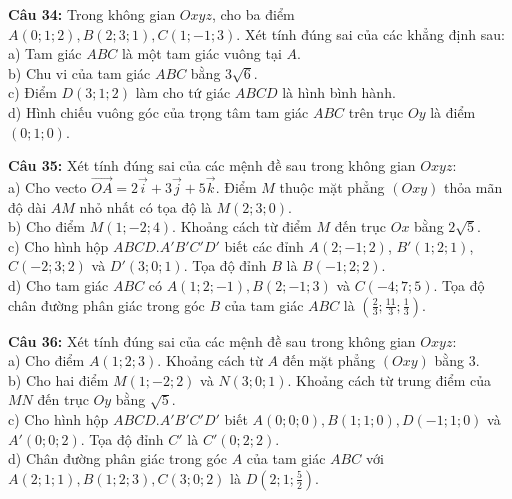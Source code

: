 \documentclass[12pt]{article}
\begin{document}
	\vspace{4mm}
	\noindent \textbf{Câu 34:} Trong không gian $Oxyz$, cho ba điểm $A(0; 1; 2), B(2; 3; 1), C(1; -1; 3)$. Xét tính đúng sai của các khẳng định sau: \\
	\noindent a) Tam giác $ABC$ là một tam giác vuông tại $A$. \\
	\noindent b) Chu vi của tam giác $ABC$ bằng $3\sqrt{6}$. \\
	\noindent c) Điểm $D(3; 1; 2)$ làm cho tứ giác $ABCD$ là hình bình hành. \\
	\noindent d) Hình chiếu vuông góc của trọng tâm tam giác $ABC$ trên trục $Oy$ là điểm $(0; 1; 0)$.
	
	\vspace{4mm}
	\noindent \textbf{Câu 35:} Xét tính đúng sai của các mệnh đề sau trong không gian $Oxyz$: \\
	\noindent a) Cho vecto $\vec{OA} = 2\vec{i} + 3\vec{j} + 5\vec{k}$. Điểm $M$ thuộc mặt phẳng $(Oxy)$ thỏa mãn độ dài $AM$ nhỏ nhất có tọa độ là $M(2; 3; 0)$. \\
	\noindent b) Cho điểm $M(1; -2; 4)$. Khoảng cách từ điểm $M$ đến trục $Ox$ bằng $2\sqrt{5}$. \\
	\noindent c) Cho hình hộp $ABCD.A'B'C'D'$ biết các đỉnh $A(2; -1; 2)$, $B'(1; 2; 1)$, $C(-2; 3; 2)$ và $D'(3; 0; 1)$. Tọa độ đỉnh $B$ là $B(-1; 2; 2)$. \\
	\noindent d) Cho tam giác $ABC$ có $A(1; 2; -1), B(2; -1; 3)$ và $C(-4; 7; 5)$. Tọa độ chân đường phân giác trong góc $B$ của tam giác $ABC$ là $\left(\frac{2}{3}; \frac{11}{3}; \frac{1}{3}\right)$.
	
	\vspace{4mm}
	\noindent \textbf{Câu 36:} Xét tính đúng sai của các mệnh đề sau trong không gian $Oxyz$: \\
	\noindent a) Cho điểm $A(1; 2; 3)$. Khoảng cách từ $A$ đến mặt phẳng $(Oxy)$ bằng $3$. \\
	\noindent b) Cho hai điểm $M(1; -2; 2)$ và $N(3; 0; 1)$. Khoảng cách từ trung điểm của $MN$ đến trục $Oy$ bằng $\sqrt{5}$. \\
	\noindent c) Cho hình hộp $ABCD.A'B'C'D'$ biết $A(0; 0; 0), B(1; 1; 0), D(-1; 1; 0)$ và $A'(0; 0; 2)$. Tọa độ đỉnh $C'$ là $C'(0; 2; 2)$. \\
	\noindent d) Chân đường phân giác trong góc $A$ của tam giác $ABC$ với $A(2; 1; 1), B(1; 2; 3), C(3; 0; 2)$ là $D\left(2; 1; \frac{5}{2}\right)$.
	
\end{document}
